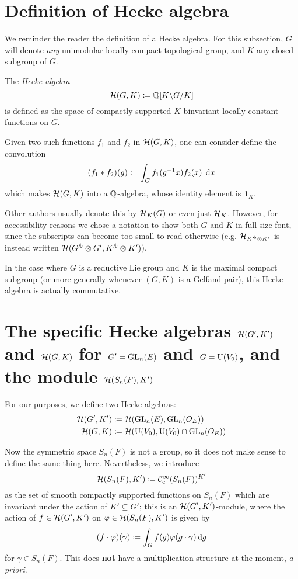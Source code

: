 \section{Definition of Hecke algebra}
We reminder the reader the definition of a Hecke algebra.
For this subsection, $G$ will denote \emph{any}
unimodular locally compact topological group,
and $K$ any closed subgroup of $G$.

\begin{definition}
  The \emph{Hecke algebra}
  \[ \mathcal H(G, K) \coloneqq \mathbb Q[K \backslash G \slash K] \]
  is defined as the space of compactly supported $K$-binvariant
  locally constant functions on $G$.

  Given two such functions $f_1$ and $f_2$ in $\mathcal H(G,K)$,
  one can consider define the convolution
  \[ (f_1 \ast f_2)(g) \coloneqq \int_G f_1(g\inv x) f_2(x) \; \odif x \]
  which makes $\mathcal H(G, K)$ into a $\mathbb Q$-algebra,
  whose identity element is $\mathbf{1}_K$.
\end{definition}

Other authors usually denote this by $\mathcal H_K(G)$ or even just $\mathcal H_K$.
However, for accessibility reasons we chose a notation to show both $G$ and $K$
in full-size font, since the subscripts can become too small to read otherwise
(e.g. $\mathcal H_{K'^\flat \otimes K'}$ is instead
written $\mathcal H(G'^\flat \otimes G', K'^\flat \otimes K')$).

In the case where $G$ is a reductive Lie group and
$K$ is the maximal compact subgroup
(or more generally whenever $(G,K)$ is a Gelfand pair),
this Hecke algebra is actually commutative.

\section{The specific Hecke algebras $\mathcal H(G',K')$ and $\mathcal H(G,K)$
  for $G' = \operatorname{GL}_n(E)$ and $G = \operatorname{U}(V_0)$, and the module $\mathcal H(S_n(F), K')$}
For our purposes, we define two Hecke algebras:
\begin{align*}
  \mathcal H(G', K') &\coloneqq \mathcal H(\operatorname{GL}_n(E), \operatorname{GL}_n(O_E)) \\
  \mathcal H(G, K) &\coloneqq \mathcal H(\operatorname{U}(V_0), \operatorname{U}(V_0) \cap \operatorname{GL}_n(O_E))
\end{align*}

Now the symmetric space $S_n(F)$ is not a group,
so it does not make sense to define the same thing here.
Nevertheless, we introduce
\[ \mathcal H(S_n(F), K') \coloneqq \mathcal C_{\mathrm{c}}^{\infty}(S_n(F))^{K'} \]
as the set of smooth compactly supported functions on $S_n(F)$
which are invariant under the action of $K' \subseteq G'$;
this is an $\mathcal H(G', K')$-module,
where the action of $f \in \mathcal H(G', K')$ on $\varphi \in \mathcal H(S_n(F), K')$ is given by
\[ (f \cdot \varphi)(\gamma) \coloneqq \int_G f(g) \varphi(g \cdot \gamma) \odif g \]
for $\gamma \in S_n(F)$.
This does \textbf{not} have a multiplication structure at the moment, \emph{a priori}.

